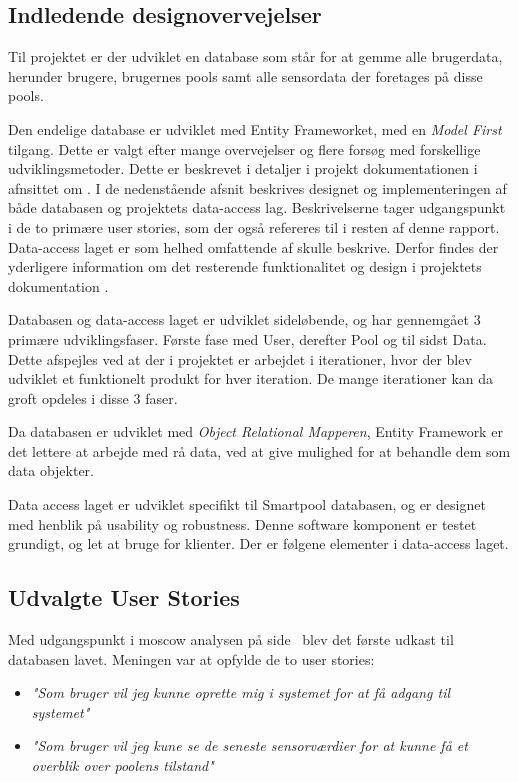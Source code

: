 \subsection{Indledende designovervejelser}\label{sec:designdatabase}

Til projektet er der udviklet en database som står for at gemme alle brugerdata, herunder brugere, brugernes pools samt alle sensordata der foretages på disse pools.

Den endelige database er udviklet med Entity Frameworket, med en \textit{Model First} tilgang. Dette er valgt efter mange overvejelser og flere forsøg med forskellige udviklingsmetoder. Dette er beskrevet i detaljer i projekt dokumentationen i afnsittet om . I de nedenstående afsnit beskrives designet og implementeringen af både databasen og projektets data-access lag. Beskrivelserne tager udgangspunkt i de to primære user stories, som der også refereres til i resten af denne rapport. Data-access laget er som helhed omfattende af skulle beskrive. Derfor findes der yderligere information om det resterende funktionalitet og design i projektets dokumentation .

Databasen og data-access laget er udviklet sideløbende, og har gennemgået 3 primære udviklingsfaser. Første fase med User, derefter Pool og til sidst Data. Dette afspejles ved at der i projektet er arbejdet i iterationer, hvor der blev udviklet et funktionelt produkt for hver iteration. De mange iterationer kan da groft opdeles i disse 3 faser.

Da databasen er udviklet med \textit{Object Relational Mapperen}, Entity Framework er det lettere at arbejde med rå data, ved at give mulighed for at behandle dem som data objekter.

Data access laget er udviklet specifikt til Smartpool databasen, og er designet med henblik på usability og robustness. Denne software komponent er testet grundigt, og let at bruge for klienter.
Der er følgene elementer i data-access laget. 
\subsection{Udvalgte User Stories}

Med udgangspunkt i \gls{moscow} analysen på side~\pageref{sec:moscow} blev det første udkast til databasen lavet. Meningen var at opfylde de to user stories: 

\begin{itemize}
	\item \textit{"Som bruger vil jeg kunne oprette mig i systemet for at få adgang til systemet"}
	\item \textit{"Som bruger vil jeg kune se de seneste sensorværdier for at kunne få et overblik over poolens tilstand"}
\end{itemize}

